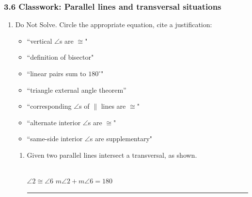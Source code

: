 

\fancyhead[LE]{\thepage}



\subsubsection*{3.6 Classwork: Parallel lines and transversal situations}
\begin{enumerate}
\item Do Not Solve. Circle the appropriate equation, cite a  justification:
  \begin{multicols}{2}
    \begin{itemize} 
      \item ``vertical $\angle$s are $\cong$" 
      \item ``definition of bisector" 
      \item ``linear pairs sum to $180^\circ$" 
      \item ``triangle external angle theorem''
      \item ``corresponding $\angle$s of $\parallel$ lines are $\cong$" 
      \item ``alternate interior $\angle$s are $\cong$"
      \item ``same-side interior $\angle$s are supplementary"
    \end{itemize}
  \end{multicols}
  \begin{enumerate}

    \item Given two parallel lines intersect a transversal, as shown. \hspace{1.5cm}
     \\[0.5cm]
    $\angle 2 \cong \angle 6$ \hspace{1cm} $m\angle 2 + m\angle 6 =  180$ \hspace{0.5cm} \rule{6cm}{0.15mm}
  

\end{enumerate}
\end{enumerate}
